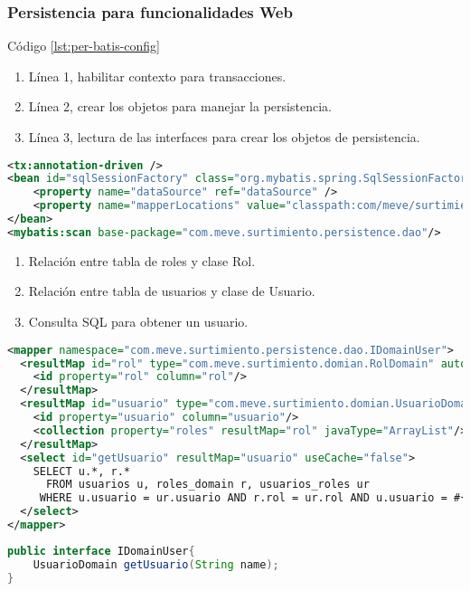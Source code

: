 \subsubsection{Persistencia para funcionalidades Web}
Código \ref{lst:per-batis-config}
\begin{enumerate}
	\item Línea 1, habilitar contexto para transacciones.
	\item Línea 2, crear los objetos para manejar la persistencia.
	\item Línea 3, lectura de las interfaces para crear los objetos de persistencia.
\end{enumerate}
\begin{lstlisting}[language=XML, caption={Configuración de MyBatis con Spring.}, captionpos=b, label={lst:per-batis-config}]
<tx:annotation-driven />
<bean id="sqlSessionFactory" class="org.mybatis.spring.SqlSessionFactoryBean">
	<property name="dataSource" ref="dataSource" />
	<property name="mapperLocations" value="classpath:com/meve/surtimiento/persistence/dao/*.xml" />
</bean>
<mybatis:scan base-package="com.meve.surtimiento.persistence.dao"/>
\end{lstlisting}

\begin{enumerate}
	\item Relación entre tabla de roles y clase Rol.
	\item Relación entre tabla de usuarios y clase de Usuario.
	\item Consulta SQL para obtener un usuario.
\end{enumerate}
\begin{lstlisting}[language=XML, caption={Definición de relación de MyBatis.}, label={
lst:per-batis-user}]
<mapper namespace="com.meve.surtimiento.persistence.dao.IDomainUser">
  <resultMap id="rol" type="com.meve.surtimiento.domian.RolDomain" autoMapping="true">
    <id property="rol" column="rol"/>
  </resultMap>
  <resultMap id="usuario" type="com.meve.surtimiento.domian.UsuarioDomain" autoMapping="true">
    <id property="usuario" column="usuario"/>
    <collection property="roles" resultMap="rol" javaType="ArrayList"/>
  </resultMap>
  <select id="getUsuario" resultMap="usuario" useCache="false">
    SELECT u.*, r.*
      FROM usuarios u, roles_domain r, usuarios_roles ur
     WHERE u.usuario = ur.usuario AND r.rol = ur.rol AND u.usuario = #{0};
  </select>
</mapper>
\end{lstlisting}

\begin{lstlisting}[language=Java, caption={Interfaz de Java para la fábrica de MyBatis.}, captionpos=b, label={lst:per-batis-user-interface}]
public interface IDomainUser{
	UsuarioDomain getUsuario(String name);
}
\end{lstlisting}


